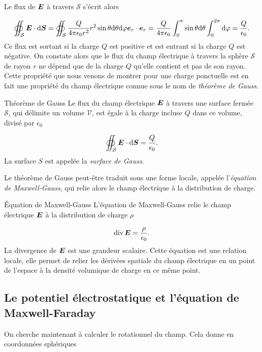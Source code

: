 Le flux de $\vece$ à travers $\mathcal{S}$ s'écrit alors

\begin{equation}
	\oiint_\mathcal{S} \vece \cdot \ds = \oiint_\mathcal{S} \dfrac{Q}{4\pi\epsilon_0 r^2}
	                       r^2 \sin \theta \dtheta \dphi \er \cdot \er
			     = \dfrac{Q}{4 \pi \epsilon_0} \int_0^\pi \sin \theta \dtheta
			     \int_0^{2\pi} \dphi
			     = \dfrac{Q}{\epsilon_0}.
\end{equation}
Ce flux est sortant si la charge $Q$ est positive et est entrant si la charge
$Q$ est négative.
On constate alors que le flux du champ électrique à travers la sphère $\mathcal{S}$
de rayon $r$ ne dépend que de la charge $Q$ qu'elle contient et pas de son rayon.
Cette propriété que nous venons de montrer pour une charge ponctuelle est en 
fait une propriété du champ électrique connue sous le nom de \emph{théorème de 
Gauss}.

\begin{defn}{Théorème de Gauss}
	Le flux du champ électrique $\vece$ à travers une surface fermée $\mathcal{S}$, 
	qui délimite un volume $\mathcal{V}$, est égale à la charge incluse $Q$ dans
	ce volume, divisé par $\epsilon_0$

	\begin{equation}
		\oiint_\mathcal{S} \vece \cdot \ds = \dfrac{Q}{\epsilon_0}.
		\label{eq:gauss}
	\end{equation}
	La surface $S$ est appelée la \emph{surface de Gauss}.
\end{defn}

Le théorème de Gauss peut-être traduit sous une forme locale, 
appelée l'\emph{équation de 
Maxwell-Gauss}, qui relie alors le champ électrique à la distribution de charge.

\begin{defn}{Équation de Maxwell-Gauss}
	L'équation de Maxwell-Gauss relie le champ électrique $\vece$ à la 
	distribution de charge $\rho$

	\begin{equation}
		\div \vece = \dfrac{\rho}{\epsilon_0}.
		\label{eq:MG}
	\end{equation}
	La divergence de $\vece$ est une grandeur scalaire. 
	Cette équation est une relation locale, elle permet de relier
	les dérivées spatiale du champ électrique en un point de l'espace à 
	la densité volumique de charge en ce même point.
\end{defn}

\subsection{Le potentiel électrostatique et l'équation de Maxwell-Faraday}
On cherche maintenant à calculer le rotationnel du champ. 
Cela donne en 
coordonnées sphériques

